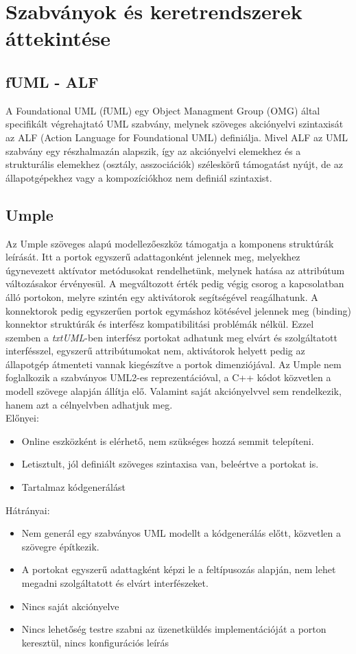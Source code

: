 \documentclass[a4paper,12pt]{report}
\begin{document}
\section{Szabványok és keretrendszerek áttekintése}
\subsection{fUML - ALF}
A Foundational UML (fUML) \cite{fmul} egy Object Managment Group (OMG) által specifikált végrehajtató UML szabvány, 
melynek szöveges akciónyelvi szintaxisát az ALF (Action Language for Foundational UML) \cite{alf} definiálja.
Mivel ALF az UML szabvány egy részhalmazán alapszik, így az akciónyelvi elemekhez és a strukturális elemekhez (osztály, asszociációk)  széleskörű támogatást nyújt, de az állapotgépekhez vagy a kompozíciókhoz nem definiál szintaxist.

\subsection{Umple}
Az Umple \cite{umple} szöveges alapú modellezőeszköz támogatja a komponens struktúrák leírását. Itt a portok egyszerű adattagonként jelennek meg, melyekhez úgynevezett aktívator metódusokat rendelhetünk, melynek hatása az attribútum változásakor érvényesül. A megváltozott érték pedig végig csorog a kapcsolatban álló portokon, melyre szintén egy aktivátorok segítségével reagálhatunk. A konnektorok pedig egyszerűen portok egymáshoz kötésével jelennek meg (binding) konnektor struktúrák és interfész kompatibilitási problémák nélkül. Ezzel szemben a \textit{txtUML}-ben interfész portokat adhatunk meg elvárt és szolgáltatott interfésszel, egyszerű attribútumokat nem, aktivátorok helyett pedig az állapotgép átmenteti vannak kiegészítve a portok dimenziójával. Az Umple nem foglalkozik a szabványos UML2-es reprezentációval, a C++ kódot közvetlen a modell szövege alapján állítja elő. Valamint saját akciónyelvvel sem rendelkezik, hanem azt a célnyelvben adhatjuk meg. \\

Előnyei:
\begin{itemize}
\item Online eszközként is elérhető, nem szükséges hozzá semmit telepíteni.
\item Letisztult, jól definiált szöveges szintaxisa van, beleértve a portokat is.
\item Tartalmaz kódgenerálást
\end{itemize}
Hátrányai:
\begin{itemize}
\item Nem generál egy szabványos UML modellt a kódgenerálás előtt, közvetlen a szövegre építkezik.
\item A portokat egyszerű adattagként képzi le a feltípusozás alapján, nem lehet megadni szolgáltatott és elvárt interfészeket.
\item Nincs saját akciónyelve
\item Nincs lehetőség testre szabni az üzenetküldés implementációját a porton keresztül, nincs konfigurációs leírás
\end{itemize}
\end{document}
